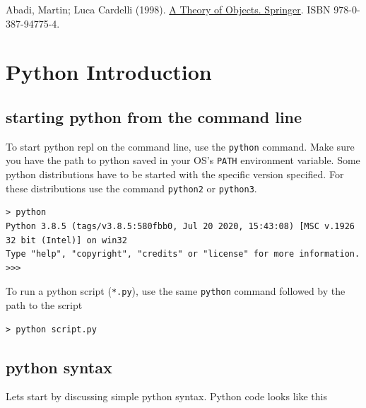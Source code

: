 Abadi, Martin; Luca Cardelli (1998).
\href{https://link.springer.com/book/10.1007/978-1-4419-8598-9}{A Theory
of Objects. Springer}. ISBN 978-0-387-94775-4.

\chapter{Python
Introduction}\label{python-introduction.md__python-introduction}

\section{starting python from the command
line}\label{python-introduction.md__starting-python-from-the-command-line}

To start python repl on the command line, use the \texttt{python}
command. Make sure you have the path to python saved in your OS's
\texttt{PATH} environment variable. Some python distributions have to be
started with the specific version specified. For these distributions use
the command \texttt{python2} or \texttt{python3}.

\begin{verbatim}
> python
Python 3.8.5 (tags/v3.8.5:580fbb0, Jul 20 2020, 15:43:08) [MSC v.1926 32 bit (Intel)] on win32
Type "help", "copyright", "credits" or "license" for more information.
>>>
\end{verbatim}

To run a python script (\texttt{*.py}), use the same \texttt{python}
command followed by the path to the script

\begin{verbatim}
> python script.py
\end{verbatim}

\section{python syntax}\label{python-introduction.md__python-syntax}

Lets start by discussing simple python syntax. Python code looks like
this

\begin{Shaded}
\begin{Highlighting}[]
\OperatorTok{=} 
\OperatorTok{=} 
\OperatorTok{+}
\end{Highlighting}
\end{Shaded}

